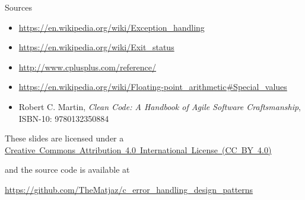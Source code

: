 \documentclass[aspectratio=169,14pt]{beamer}
\begin{document}
\begin{frame}{Sources}
    \begin{itemize}
        \item \url{https://en.wikipedia.org/wiki/Exception_handling}
        \item \url{https://en.wikipedia.org/wiki/Exit_status}
        \item \url{http://www.cplusplus.com/reference/}
        \item \url{https://en.wikipedia.org/wiki/Floating-point_arithmetic\#Special_values}
        \item Robert C. Martin, \textit{Clean Code: A Handbook of Agile Software Craftsmanship}, ISBN-10: 9780132350884 
    \end{itemize}
    
    \begin{footnotesize}
        \begin{center}
            These slides are licensed under a \href{https://creativecommons.org/licenses/by/4.0/}{Creative~Commons~Attribution~4.0~International~License~(CC~BY~4.0)}
            
            and the source code is available at
            
            \url{https://github.com/TheMatjaz/c_error_handling_design_patterns}
        \end{center}    
    \end{footnotesize}
\end{frame}
\end{document}
